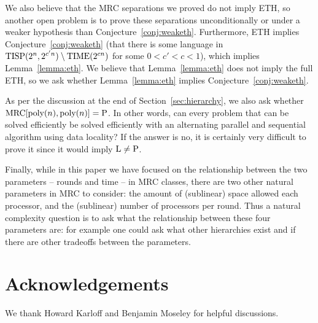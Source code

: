 \documentclass[letterpaper,USenglish]{lipics}
\theoremstyle{definition}
\theoremstyle{remark}
\newcommand{\mrc}{\textup{MRC}}
\newcommand{\TIME}{\textup{TIME}}
\newcommand{\TISP}{\textup{TISP}}
\renewcommand{\P}{\textup{P}}
\renewcommand{\L}{\textup{L}}
\begin{document}
We also believe that the MRC separations we proved do not imply ETH, so another
open problem is to prove these separations unconditionally or under a weaker
hypothesis than Conjecture~\ref{conj:weaketh}. Furthermore, ETH implies
Conjecture~\ref{conj:weaketh} (that there is some language in $\TISP(2^n,
2^{c'n}) \setminus \TIME(2^{cn})$ for some $0 < c' < c < 1$), which implies
Lemma~\ref{lemma:eth}. We believe that Lemma~\ref{lemma:eth} does not imply the
full ETH, so we ask whether Lemma~\ref{lemma:eth} implies
Conjecture~\ref{conj:weaketh}.

As per the discussion at the end of Section~\ref{sec:hierarchy}, we also ask
whether $\mrc[\text{poly}(n), \text{poly}(n)] = \P$. In other words, can every
problem that can be solved efficiently be solved efficiently with an
alternating parallel and sequential algorithm using data locality? If the
answer is no, it is certainly very difficult to prove it since it would imply
$\L\neq\P$.

Finally, while in this paper we have focused on the relationship between the
two parameters -- rounds and time -- in MRC classes, there are two other
natural parameters in MRC to consider:  the amount of (sublinear) space allowed
each processor, and the (sublinear) number of processors per round. Thus a
natural complexity question is to ask what the relationship between these four
parameters are: for example one could ask what other hierarchies exist and if
there are other tradeoffs between the parameters.

\section*{Acknowledgements} We thank Howard Karloff and Benjamin Moseley for
helpful discussions.




\end{document}

